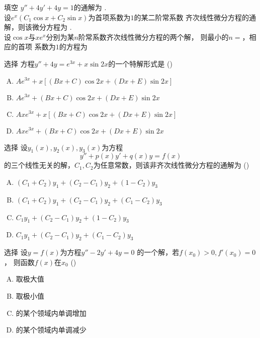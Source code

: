 \begin{frame}{填空}
	\linespread{2}
	\;$y''+4y'+4y=1$的通解为
	\underline{\;}.\\[1em]
	
	\;设$e^x(C_1\cos x+C_2\sin x)$为首项系数为$1$的某二阶常系数
	齐次线性微分方程的通解，则该微分方程为
	\underline{\;}.\\[1em]
	
	\;设$\cos x$与$xe^x$分别为某$n$阶常系数齐次线性微分方程的两个解，
	则最小的$n=$\underline{\;}，相应的首项
	系数为$1$的方程为\underline{\uncover<5->{\;\b{$
	y^{(4)}-2y^{(3)}+2y''-2y'+y=0$}\;}}
	
\end{frame}

\begin{frame}{选择}
	\linespread{1.5}
	\;方程$y''+4y=e^{3x}+x\sin 2x$的一个特解形式是
	(\underline{\;})
	\begin{enumerate}[(A)]
	  \item $Ae^{3x}+x[(Bx+C)\cos2x+(Dx+E)\sin2x]$
	  \item $Ae^{3x}+(Bx+C)\cos2x+(Dx+E)\sin2x$
	  \item $Axe^{3x}+x[(Bx+C)\cos2x+(Dx+E)\sin2x]$
	  \item $Axe^{3x}+(Bx+C)\cos2x+(Dx+E)\sin2x$
	\end{enumerate}
\end{frame}

\begin{frame}{选择}
	\linespread{1.3}
	\;设$y_1(x),y_2(x),y_3(x)$为方程
	$$y''+p(x)y'+q(x)y=f(x)$$
	的三个线性无关的解，$C_1,C_2$为任意常数，则该非齐次线性微分方程的通解为
	(\underline{\;})
	\begin{enumerate}[(A)]
	  \item $(C_1+C_2)y_1+(C_2-C_1)y_2+(1-C_2)y_3$
	  \item $(C_1+C_2)y_1+(C_2-C_1)y_2+(C_1-C_2)y_3$
	  \item $C_1y_1+(C_2-C_1)y_2+(1-C_2)y_3$
	  \item $C_1y_1+(C_2-C_1)y_2+(C_1-C_2)y_3$
	\end{enumerate}
\end{frame}

\begin{frame}{选择}
	\linespread{1.3}
	\;设$y=f(x)$为方程$y''-2y'+4y=0$
	的一个解，若$f(x_0)>0,f'(x_0)=0$，
	则函数$f(x)$在$x_0$
	(\underline{\;})
	\begin{enumerate}[(A)]
	  \item 取极大值
	  \item 取极小值
	  \item 的某个领域内单调增加
	  \item 的某个领域内单调减少
	\end{enumerate}
\end{frame}

